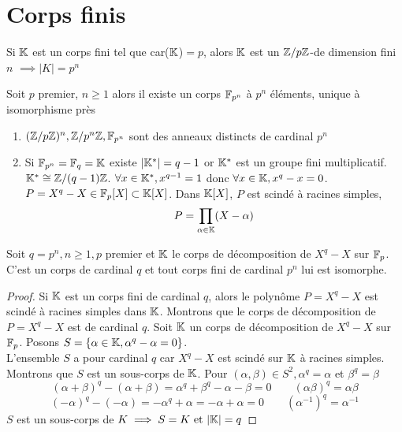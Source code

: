 \documentclass[]{report}
\begin{document}
    \section{Corps finis}
    
    Si $\mathbb{K}$ est un corps fini tel que car($\mathbb{K}$)$=p$, alors $\mathbb{K}$ est un $\mathbb{Z}/p\mathbb{Z}$-\ev de dimension fini $n$ $\implies |K|=p^n$

    \begin{tm}{}{}
        Soit $p$ premier, $n\ge 1$ alors il existe un corps $\mathbb{F}_{p^n}$ à $p^n$ éléments, unique à isomorphisme près
    \end{tm}

    \begin{re}{}{}
        \begin{enumerate}
        \item $(\mathbb{Z}/p\mathbb{Z})^n,\mathbb{Z}/p^n\mathbb{Z},\mathbb{F}_{p^n}$ sont des anneaux distincts de cardinal $p^n$
        \item Si $\mathbb{F}_{p^n}=\mathbb{F}_q=\mathbb{K}$ existe $|\mathbb{K}^*|=q-1$ or $\mathbb{K}^*$ est un groupe fini multiplicatif. $\mathbb{K}^*\cong\mathbb{Z}/(q-1)\mathbb{Z}$. $\forall x\in \mathbb{K}^*,x^{q-1}=1$ donc $\forall x\in \mathbb{K},x^q-x=0$. $P=X^q-X\in \mathbb{F}_p[X]\subset \mathbb{K}[X]$. Dans $\mathbb{K}[X]$, $P$ est scindé à racines simples,
        \[P=\prod_{\alpha\in \mathbb{K}}(X-\alpha)\]
        \end{enumerate}
    \end{re}

    \begin{tm}{}{}
        Soit $q=p^n,n\ge 1,p$ premier et $\mathbb{K}$ le corps de décomposition de $X^q-X$ sur $\mathbb{F}_p$. C'est un corps de cardinal $q$ et tout corps fini de cardinal $p^n$ lui est isomorphe.
    \end{tm}

    \begin{proof}
        Si $\mathbb{K}$ est un corps fini de cardinal $q$, alors le polynôme $P=X^q-X$ est scindé à racines simples dans $\mathbb{K}$. Montrons que le corps de décomposition de $P=X^q-X$ est de cardinal $q$. Soit $\mathbb{K}$ un corps de décomposition de $X^q-X$ sur $\mathbb{F}_p$. Posons $S=\{\alpha\in \mathbb{K},\alpha^q-\alpha=0\}$.\\
        L'ensemble $S$ a pour cardinal $q$ car $X^q-X$ est scindé sur $\mathbb{K}$ à racines simples.\\
        Montrons que $S$ est un sous-corps de $\mathbb{K}$. Pour $(\alpha,\beta)\in S^2,\alpha^q=\alpha$ et $\beta^q=\beta$\\
        \[(\alpha+\beta)^q-(\alpha+\beta)=\alpha^q+\beta^q-\alpha-\beta=0\qquad (\alpha\beta)^q=\alpha\beta\]
        \[(-\alpha)^q-(-\alpha)=-\alpha^q+\alpha=-\alpha+\alpha=0\qquad (\alpha^{-1})^q=\alpha^{-1}\]
        $S$ est un sous-corps de $K\implies S=K\text{ et }|\mathbb{K}|=q$
    \end{proof}
\end{document}
